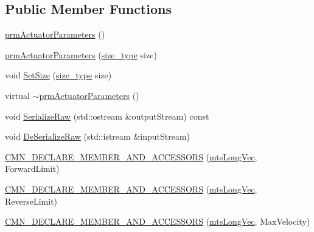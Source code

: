 \subsection*{Public Member Functions}
\begin{DoxyCompactItemize}
\item 
\hyperlink{classprm_actuator_parameters_a9ad6bc60dc8bbfc8cffc764c3366efe0}{prm\-Actuator\-Parameters} ()
\item 
\hyperlink{classprm_actuator_parameters_ac2f872f92b41ce493edc9e9361de24ef}{prm\-Actuator\-Parameters} (\hyperlink{classprm_actuator_parameters_a0b8bdcb6c28e1f3028d93cf9b6ca1ee0}{size\-\_\-type} size)
\item 
void \hyperlink{classprm_actuator_parameters_a36ea3d84dd6a90830e028ec5d920cc78}{Set\-Size} (\hyperlink{classprm_actuator_parameters_a0b8bdcb6c28e1f3028d93cf9b6ca1ee0}{size\-\_\-type} size)
\item 
virtual \hyperlink{classprm_actuator_parameters_a40956ddd7a494305d9ad5ce2aa61171f}{$\sim$prm\-Actuator\-Parameters} ()
\item 
void \hyperlink{classprm_actuator_parameters_a6f2304ef6f0362ac366a920f9ceea746}{Serialize\-Raw} (std\-::ostream \&output\-Stream) const 
\item 
void \hyperlink{classprm_actuator_parameters_a795018ccea6a67b80dd75c84598fb8c9}{De\-Serialize\-Raw} (std\-::istream \&input\-Stream)
\end{DoxyCompactItemize}
{\bf }\par
\begin{DoxyCompactItemize}
\item 
\hyperlink{classprm_actuator_parameters_a9447a49754acbe582db1d51dfb2824ef}{C\-M\-N\-\_\-\-D\-E\-C\-L\-A\-R\-E\-\_\-\-M\-E\-M\-B\-E\-R\-\_\-\-A\-N\-D\-\_\-\-A\-C\-C\-E\-S\-S\-O\-R\-S} (\hyperlink{mts_vector_8h_a3e011934ab1b5774f640a7bb70d9a672}{mts\-Long\-Vec}, Forward\-Limit)
\end{DoxyCompactItemize}

{\bf }\par
\begin{DoxyCompactItemize}
\item 
\hyperlink{classprm_actuator_parameters_a1eac2da8fad6fb16fb7ddac367bf1cdf}{C\-M\-N\-\_\-\-D\-E\-C\-L\-A\-R\-E\-\_\-\-M\-E\-M\-B\-E\-R\-\_\-\-A\-N\-D\-\_\-\-A\-C\-C\-E\-S\-S\-O\-R\-S} (\hyperlink{mts_vector_8h_a3e011934ab1b5774f640a7bb70d9a672}{mts\-Long\-Vec}, Reverse\-Limit)
\end{DoxyCompactItemize}

{\bf }\par
\begin{DoxyCompactItemize}
\item 
\hyperlink{classprm_actuator_parameters_a9d1f39b478007a7b8ff69d4799f47b23}{C\-M\-N\-\_\-\-D\-E\-C\-L\-A\-R\-E\-\_\-\-M\-E\-M\-B\-E\-R\-\_\-\-A\-N\-D\-\_\-\-A\-C\-C\-E\-S\-S\-O\-R\-S} (\hyperlink{mts_vector_8h_a3e011934ab1b5774f640a7bb70d9a672}{mts\-Long\-Vec}, Max\-Velocity)
\end{DoxyCompactItemize}

